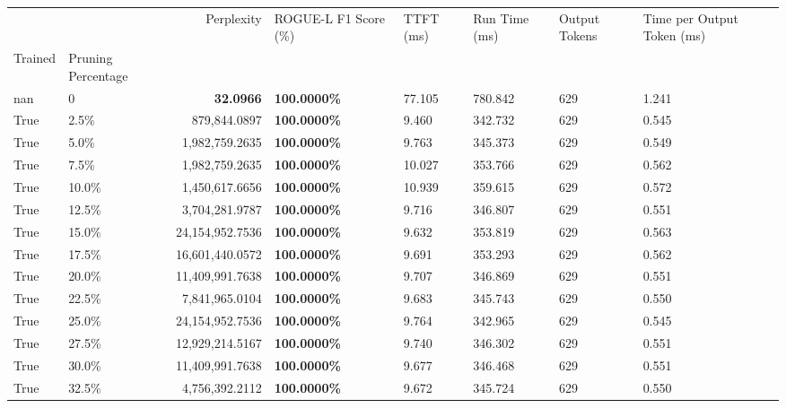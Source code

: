 \begin{table}[H]
\label{tab:evaluation-pipeline-1-trained}
\begin{tabular}{|m{}| m{}| r | R{0.13\textwidth}| R{0.09\textwidth}| R{0.09\textwidth}| R{0.09\textwidth}| R{0.11\textwidth}|}
\toprule
 &  & Perplexity & ROGUE-L F1 Score (\%) & TTFT (ms) & Run Time (ms) & Output Tokens & Time per Output Token (ms) \\
Trained & Pruning Percentage &  &  &  &  &  &  \\
\midrule
nan & 0 & \bfseries 32.0966 & \bfseries 100.0000\% & 77.105 & 780.842 & 629 & 1.241 \\
True & 2.5\% & 879,844.0897 & \bfseries \color{red} 100.0000\% & 9.460 & 342.732 & 629 & 0.545 \\
True & 5.0\% & 1,982,759.2635 & \bfseries \color{red} 100.0000\% & 9.763 & 345.373 & 629 & 0.549 \\
True & 7.5\% & 1,982,759.2635 & \bfseries \color{red} 100.0000\% & 10.027 & 353.766 & 629 & 0.562 \\
True & 10.0\% & 1,450,617.6656 & \bfseries \color{red} 100.0000\% & 10.939 & 359.615 & 629 & 0.572 \\
True & 12.5\% & 3,704,281.9787 & \bfseries \color{red} 100.0000\% & 9.716 & 346.807 & 629 & 0.551 \\
True & 15.0\% & 24,154,952.7536 & \bfseries \color{red} 100.0000\% & 9.632 & 353.819 & 629 & 0.563 \\
True & 17.5\% & 16,601,440.0572 & \bfseries \color{red} 100.0000\% & 9.691 & 353.293 & 629 & 0.562 \\
True & 20.0\% & 11,409,991.7638 & \bfseries \color{red} 100.0000\% & 9.707 & 346.869 & 629 & 0.551 \\
True & 22.5\% & 7,841,965.0104 & \bfseries \color{red} 100.0000\% & 9.683 & 345.743 & 629 & 0.550 \\
True & 25.0\% & 24,154,952.7536 & \bfseries \color{red} 100.0000\% & 9.764 & 342.965 & 629 & 0.545 \\
True & 27.5\% & 12,929,214.5167 & \bfseries \color{red} 100.0000\% & 9.740 & 346.302 & 629 & 0.551 \\
True & 30.0\% & 11,409,991.7638 & \bfseries \color{red} 100.0000\% & 9.677 & 346.468 & 629 & 0.551 \\
True & 32.5\% & 4,756,392.2112 & \bfseries \color{red} 100.0000\% & 9.672 & 345.724 & 629 & 0.550 \\

\end{tabular}
\end{table}
